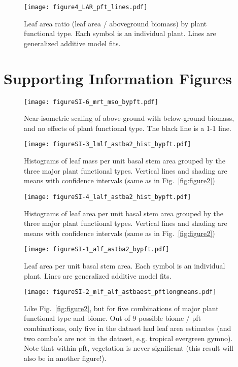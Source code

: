 \documentclass[a4paper]{article}\usepackage[]{graphicx}\usepackage[]{color}
\begin{document}
\begin{figure}[h!]
    \centering
    \texttt{[image: figure4\_LAR\_pft\_lines.pdf]}
    \caption{Leaf area ratio (leaf area / aboveground biomass) by plant functional type. Each symbol is an individual plant. Lines are generalized additive model fits.}
    \label{fig:figure4}
\end{figure}


\clearpage
\section{Supporting Information Figures}

\begin{figure}[h!]
    \centering
    \texttt{[image: figureSI-6\_mrt\_mso\_bypft.pdf]}
    \caption{Near-isometric scaling of above-ground with below-ground biomass, and no effects of plant functional type. The black line is a 1-1 line.}
    \label{fig:figureSI6}
\end{figure}

\begin{figure}[h!]
    \centering
    \texttt{[image: figureSI-3\_lmlf\_astba2\_hist\_bypft.pdf]}
    \caption{Histograms of leaf mass per unit basal stem area grouped by the three major plant functional types. Vertical lines and shading are means with confidence intervals (same as in Fig.~\ref{fig:figure2})}
    \label{fig:figureSI3}
\end{figure}

\begin{figure}[h!]
    \centering
    \texttt{[image: figureSI-4\_lalf\_astba2\_hist\_bypft.pdf]}
    \caption{Histograms of leaf area per unit basal stem area grouped by the three major plant functional types. Vertical lines and shading are means with confidence intervals (same as in Fig.~\ref{fig:figure2})}
    \label{fig:figureSI4}
\end{figure}


\begin{figure}[h!]
    \centering
    \texttt{[image: figureSI-1\_alf\_astba2\_bypft.pdf]}
    \caption{Leaf area per unit basal stem area. Each symbol is an individual plant. Lines are generalized additive model fits.}
    \label{fig:figureSI1}
\end{figure}

\begin{figure}[h!]
    \centering
    \texttt{[image: figureSI-2\_mlf\_alf\_astbaest\_pftlongmeans.pdf]}
    \caption{Like Fig.~\ref{fig:figure2}, but for five combinations of major plant functional type and biome. Out of 9 possible biome / pft combinations, only five in the dataset had leaf area estimates (and two combo's are not in the dataset, e.g. tropical evergreen gymno). Note that within pft, vegetation is never significant (this result will also be in another figure!).}
    \label{fig:figureSI2}
\end{figure}
\end{document}
